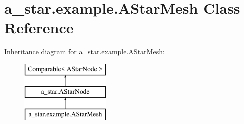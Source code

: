 \hypertarget{classa__star_1_1example_1_1_a_star_mesh}{\section{a\-\_\-star.\-example.\-A\-Star\-Mesh Class Reference}
\label{classa__star_1_1example_1_1_a_star_mesh}
}
Inheritance diagram for a\-\_\-star.\-example.\-A\-Star\-Mesh\-:\begin{figure}[H]
\begin{center}
\leavevmode
\includegraphics[height=3.000000cm]{classa__star_1_1example_1_1_a_star_mesh}
\end{center}
\end{figure}
